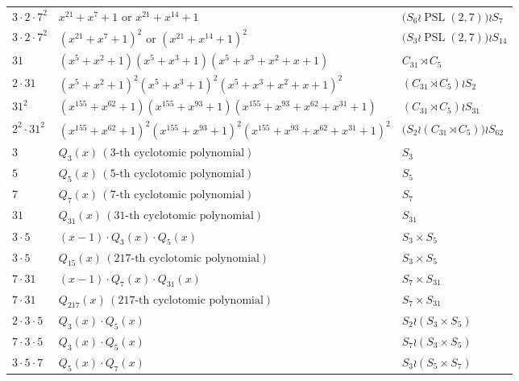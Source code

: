 \documentclass[journal,12pt,onecolumn]{IEEEtran}
\begin{document}
\begin{table}[!t]
\begin{tabular}{lll}
        $3\cdot2\cdot 7^2$ & $x^{21}+x^7+1\text{ or }x^{21}+x^{14}+1$ & $\big(S_6 \wr \operatorname{PSL}(2,7)\big) \wr S_{7}$ \\   

        $3\cdot2\cdot 7^2$ & $(x^{21}+x^7+1)^2\text{ or }(x^{21}+x^{14}+1)^2$ & $\big(S_3 \wr \operatorname{PSL}(2,7)\big) \wr S_{14}$ \\   

        $31$ & $(x^5 + x^2 + 1)(x^5 + x^3 + 1)(x^5 + x^3 + x^2 + x + 1)$ & $C_{31}\rtimes C_5$ \\   

        $2\cdot 31$ & $(x^5 + x^2 + 1)^2(x^5 + x^3 + 1)^2(x^5 + x^3 + x^2 + x + 1)^2$ & $(C_{31}\rtimes C_5) \wr S_2$ \\   

        $31^2$ & $(x^{155} + x^{62} + 1)(x^{155} + x^{93} + 1)(x^{155} + x^{93} + x^{62} + x^{31} + 1)$ & $(C_{31}\rtimes C_5) \wr S_{31}$ \\   

        $2^2\cdot 31^2$ & $(x^{155} + x^{62} + 1)^2(x^{155} + x^{93} + 1)^2(x^{155} + x^{93} + x^{62} + x^{31} + 1)^2$ & $\big(S_{2} \wr (C_{31}\rtimes C_5)\big) \wr S_{62}$ \\   

        $3$ & $Q_{3}(x)\,(3\text{-th cyclotomic polynomial})$ & $S_3$ \\   
        
        $5$ & $Q_{5}(x)\,(5\text{-th cyclotomic polynomial})$ & $S_5$ \\   

        $7$ & $Q_{7}(x)\,(7\text{-th cyclotomic polynomial})$ & $S_7$ \\   

        $31$ & $Q_{31}(x)\,(31\text{-th cyclotomic polynomial})$ & $S_{31}$ \\   

        $3\cdot 5$ & $(x-1)\cdot Q_{3}(x)\cdot Q_{5}(x)$ & $S_3\times S_{5}$ \\   

        $3\cdot 5$ & $Q_{15}(x)\,(217\text{-th cyclotomic polynomial})$ & $S_3\times S_{5}$ \\   

        $7\cdot 31$ & $(x-1)\cdot Q_{7}(x)\cdot Q_{31}(x)$ & $S_7\times S_{31}$ \\   

        $7\cdot 31$ & $Q_{217}(x)\,(217\text{-th cyclotomic polynomial})$ & $S_7\times S_{31}$ \\   

        $2\cdot 3\cdot 5$ & $Q_{3}(x)\cdot Q_{5}(x)$ & $S_2 \wr (S_3\times S_{5})$ \\   

        $7\cdot 3\cdot 5$ & $Q_{3}(x)\cdot Q_{5}(x)$ & $S_7 \wr (S_3\times S_{5})$ \\   

        $3\cdot 5\cdot 7$ & $Q_{5}(x)\cdot Q_{7}(x)$ & $S_3 \wr (S_5\times S_{7})$ \\
        \bottomrule[1.2pt]
	\end{tabular}
	\label{B_E}
    \end{table}
\end{document}
